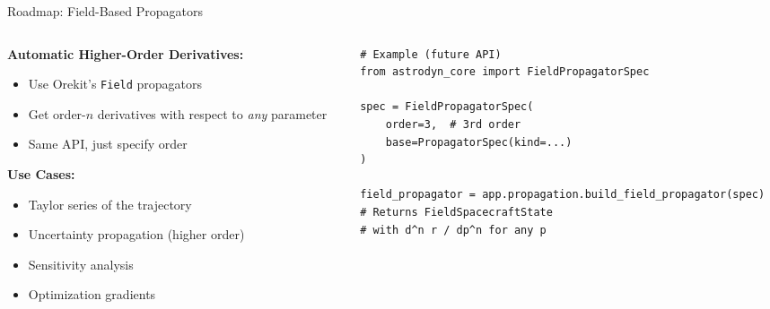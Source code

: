 \documentclass[aspectratio=169,12pt]{beamer}
\begin{document}
\begin{frame}[fragile]{Roadmap: Field-Based Propagators}
    \begin{columns}
        \begin{column}{0.6\textwidth}
            \textbf{Automatic Higher-Order Derivatives:}
            \begin{itemize}
                \item Use Orekit's \texttt{Field} propagators
                \item Get order-$n$ derivatives with respect to \emph{any} parameter
                \item Same API, just specify order
            \end{itemize}
            \vspace{0.3cm}
            \textbf{Use Cases:}
            \begin{itemize}
                \item Taylor series of the trajectory
                \item Uncertainty propagation (higher order)
                \item Sensitivity analysis
                \item Optimization gradients
            \end{itemize}
        \end{column}
        \begin{column}{0.4\textwidth}
            \begin{verbatim}
# Example (future API)
from astrodyn_core import FieldPropagatorSpec

spec = FieldPropagatorSpec(
    order=3,  # 3rd order
    base=PropagatorSpec(kind=...)
)

field_propagator = app.propagation.build_field_propagator(spec)
# Returns FieldSpacecraftState
# with d^n r / dp^n for any p
            \end{verbatim}
        \end{column}
    \end{columns}
\end{frame}
\end{document}
